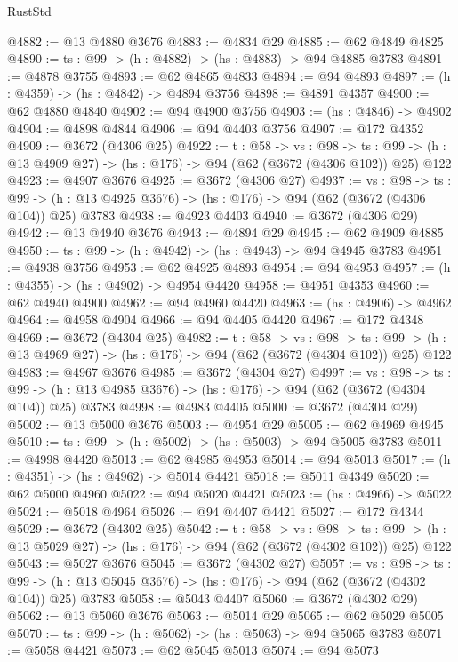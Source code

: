 \begin{lexlean}{RustStd}
\begin{coremodule}
{\begin{coremodule}
{{{{{{{{{{{@4882 := @13 @4880 @3676
@4883 := @4834 @29
@4885 := @62 @4849 @4825
@4890 := {ts : @99} -> (h : @4882) -> (hs : @4883) -> @94 @4885 @3783
@4891 := @4878 @3755
@4893 := @62 @4865 @4833
@4894 := @94 @4893
@4897 := (h : @4359) -> (hs : @4842) -> @4894 @3756
@4898 := @4891 @4357
@4900 := @62 @4880 @4840
@4902 := @94 @4900 @3756
@4903 := (hs : @4846) -> @4902
@4904 := @4898 @4844
@4906 := @94 @4403 @3756
@4907 := @172 @4352
@4909 := @3672 (@4306 @25)
@4922 := {t : @58} ->
  {vs : @98} ->
  {ts : @99} -> (h : @13 @4909 @27) -> (hs : @176) -> @94 (@62 (@3672 (@4306 @102)) @25) @122
@4923 := @4907 @3676
@4925 := @3672 (@4306 @27)
@4937 := {vs : @98} ->
  {ts : @99} -> (h : @13 @4925 @3676) -> (hs : @176) -> @94 (@62 (@3672 (@4306 @104)) @25) @3783
@4938 := @4923 @4403
@4940 := @3672 (@4306 @29)
@4942 := @13 @4940 @3676
@4943 := @4894 @29
@4945 := @62 @4909 @4885
@4950 := {ts : @99} -> (h : @4942) -> (hs : @4943) -> @94 @4945 @3783
@4951 := @4938 @3756
@4953 := @62 @4925 @4893
@4954 := @94 @4953
@4957 := (h : @4355) -> (hs : @4902) -> @4954 @4420
@4958 := @4951 @4353
@4960 := @62 @4940 @4900
@4962 := @94 @4960 @4420
@4963 := (hs : @4906) -> @4962
@4964 := @4958 @4904
@4966 := @94 @4405 @4420
@4967 := @172 @4348
@4969 := @3672 (@4304 @25)
@4982 := {t : @58} ->
  {vs : @98} ->
  {ts : @99} -> (h : @13 @4969 @27) -> (hs : @176) -> @94 (@62 (@3672 (@4304 @102)) @25) @122
@4983 := @4967 @3676
@4985 := @3672 (@4304 @27)
@4997 := {vs : @98} ->
  {ts : @99} -> (h : @13 @4985 @3676) -> (hs : @176) -> @94 (@62 (@3672 (@4304 @104)) @25) @3783
@4998 := @4983 @4405
@5000 := @3672 (@4304 @29)
@5002 := @13 @5000 @3676
@5003 := @4954 @29
@5005 := @62 @4969 @4945
@5010 := {ts : @99} -> (h : @5002) -> (hs : @5003) -> @94 @5005 @3783
@5011 := @4998 @4420
@5013 := @62 @4985 @4953
@5014 := @94 @5013
@5017 := (h : @4351) -> (hs : @4962) -> @5014 @4421
@5018 := @5011 @4349
@5020 := @62 @5000 @4960
@5022 := @94 @5020 @4421
@5023 := (hs : @4966) -> @5022
@5024 := @5018 @4964
@5026 := @94 @4407 @4421
@5027 := @172 @4344
@5029 := @3672 (@4302 @25)
@5042 := {t : @58} ->
  {vs : @98} ->
  {ts : @99} -> (h : @13 @5029 @27) -> (hs : @176) -> @94 (@62 (@3672 (@4302 @102)) @25) @122
@5043 := @5027 @3676
@5045 := @3672 (@4302 @27)
@5057 := {vs : @98} ->
  {ts : @99} -> (h : @13 @5045 @3676) -> (hs : @176) -> @94 (@62 (@3672 (@4302 @104)) @25) @3783
@5058 := @5043 @4407
@5060 := @3672 (@4302 @29)
@5062 := @13 @5060 @3676
@5063 := @5014 @29
@5065 := @62 @5029 @5005
@5070 := {ts : @99} -> (h : @5062) -> (hs : @5063) -> @94 @5065 @3783
@5071 := @5058 @4421
@5073 := @62 @5045 @5013
@5074 := @94 @5073
}}}}}}}}}}}
\end{coremodule}}
\end{coremodule}
\end{lexlean}
